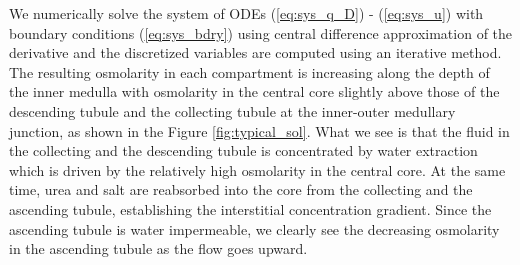 \documentclass{article}
\numberwithin{equation}{section} %
\begin{document}
We numerically solve the system of ODEs (\ref{eq:sys_q_D}) - (\ref{eq:sys_u}) with boundary conditions (\ref{eq:sys_bdry}) using central difference approximation of the derivative and the discretized variables are computed using an iterative method.
The resulting osmolarity in each compartment is increasing along the depth of the inner medulla with osmolarity in the central core slightly above those of the descending tubule and the collecting tubule at the inner-outer medullary junction, as shown in the Figure \ref{fig:typical_sol}.
What we see is that the fluid in the collecting and the descending tubule is concentrated by water extraction which is driven by the relatively high osmolarity in the central core.
At the same time, urea and salt are reabsorbed into the core from the collecting and the ascending tubule, establishing the interstitial concentration gradient.
Since the ascending tubule is water impermeable, we clearly see the decreasing osmolarity in the ascending tubule as the flow goes upward.
\end{document}
